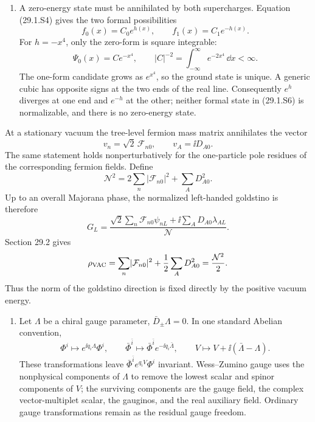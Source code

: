 \begin{enumerate}
\begin{enumerate}
    \item A zero-energy state must be annihilated by both supercharges.
    Equation (29.1.S4) gives the two formal possibilities
    \[
      f_0(x)=C_0e^{h(x)},
      \qquad
      f_1(x)=C_1e^{-h(x)}.
      \tag{29.1.S6}
    \]
    For \(h=-x^4\), only the zero-form is square integrable:
    \[
      \boxed{\Psi_0(x)=C e^{-x^4},\qquad
      |C|^{-2}=\int_{-\infty}^{\infty}e^{-2x^4}\,\dd x<\infty.}
      \tag{29.1.S7}
    \]
    The one-form candidate grows as \(e^{x^4}\), so the ground state is
    unique.  A generic cubic has opposite signs at the two ends of the real
    line.  Consequently \(e^h\) diverges at one end and \(e^{-h}\) at the
    other; neither formal state in (29.1.S6) is normalizable, and there is
    no zero-energy state.
  \end{enumerate}

At a stationary vacuum the tree-level fermion mass matrix annihilates
  the vector
  \[
    v_n=\sqrt2\,\mathcal F_{n0},\qquad
    v_A=\ii D_{A0}.
  \]
  The same statement holds nonperturbatively for the one-particle pole
  residues of the corresponding fermion fields.  Define
  \[
    \mathcal N^2
      =2\sum_n\lvert\mathcal F_{n0}\rvert^2
       +\sum_A D_{A0}^2 .
  \]
  Up to an overall Majorana phase, the normalized left-handed goldstino
  is therefore
  \[
    G_L=\frac{
      \sqrt2\sum_n\mathcal F_{n0}\psi_{nL}
      +\ii\sum_A D_{A0}\lambda_{AL}}
      {\mathcal N}.
  \]
  Section 29.2 gives
  \[
    \rho_{\rm VAC}
      =\sum_n\lvert\mathcal F_{n0}\rvert^2
       +\frac12\sum_A D_{A0}^2
      =\frac{\mathcal N^2}{2}.
  \]
  Thus the norm of the goldstino direction is fixed directly by the
  positive vacuum energy.

  \begin{enumerate}
    \item Let \(\Lambda\) be a chiral gauge parameter,
    \(\bar D_\pm\Lambda=0\).  In one standard Abelian convention,
    \[
      \Phi^i\longmapsto e^{\ii q_i\Lambda}\Phi^i,
      \qquad
      \bar\Phi^{\bar i}\longmapsto
        \bar\Phi^{\bar i}e^{-\ii q_i\bar\Lambda},
      \qquad
      V\longmapsto V+\ii(\bar\Lambda-\Lambda).
      \tag{29.3.S1}
    \]
    These transformations leave
    \(\bar\Phi^{\bar i}e^{q_iV}\Phi^i\) invariant.  Wess--Zumino gauge
    uses the nonphysical components of \(\Lambda\) to remove the lowest
    scalar and spinor components of \(V\); the surviving components are
    the gauge field, the complex vector-multiplet scalar, the gauginos,
    and the real auxiliary field.  Ordinary gauge transformations remain
    as the residual gauge freedom.


\end{enumerate}
\end{enumerate}
